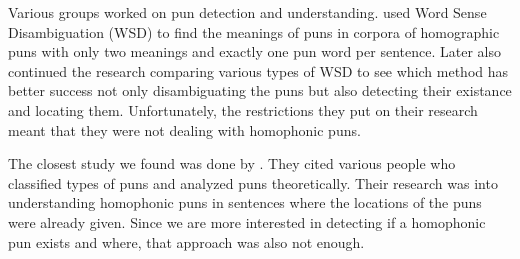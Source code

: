 \documentclass[11pt,a4paper]{article}
\begin{document}
Various groups worked on pun detection and understanding. \citet{miller_gurevych_2015} used Word Sense Disambiguation (WSD) to find the meanings of puns in corpora of homographic puns with only two meanings and exactly one pun word per sentence. Later \citet{miller_hempelmann_gurevych_2017} also continued the research comparing various types of WSD to see which method has better success not only disambiguating the puns but also detecting their existance and locating them. Unfortunately, the restrictions they put on their research meant that they were not dealing with homophonic puns.

The closest study we found was done by \citet{jaech_koncel-kedziorski_ostendorf_2016}. They cited various people who classified types of puns and analyzed puns theoretically. Their research was into understanding homophonic puns in sentences where the locations of the puns were already given. Since we are more interested in detecting if a homophonic pun exists and where, that approach was also not enough.

%
% 






\end{document}
